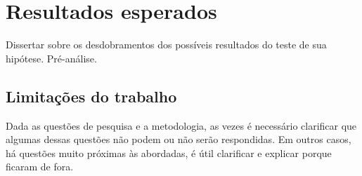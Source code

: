 \chapter{Resultados esperados}

Dissertar sobre os desdobramentos dos possíveis resultados do teste de sua hipótese. Pré-análise.

\section{Limitações do trabalho}

Dada as questões de pesquisa e a metodologia, as vezes é necessário clarificar que algumas dessas questões não podem ou não serão respondidas. Em outros casos, há questões muito próximas às abordadas, é útil clarificar e explicar porque ficaram de fora.
